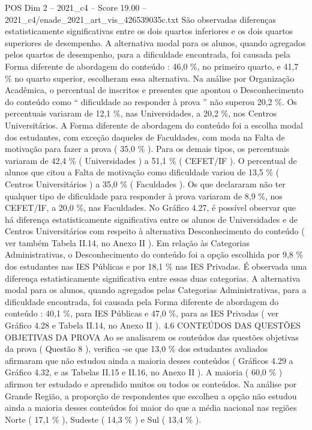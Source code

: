 \begin{textsample}{POS Dim 2 – 2021\_c4 – Score 19.00 – 2021\_c4/enade\_2021\_art\_vis\_426539035c.txt}
São observadas diferenças estatisticamente significativas entre os dois quartos inferiores e os dois quartos superiores de desempenho.
A alternativa modal para os alunos, quando agregados pelos quartos de desempenho, para a dificuldade encontrada, foi causada pela Forma diferente de abordagem do conteúdo : 46,0 \%, no primeiro quarto, e 41,7 \% no quarto superior, escolheram essa alternativa.
Na análise por Organização Acadêmica, o percentual de inscritos e presentes que apontou o Desconhecimento do conteúdo como “ dificuldade ao responder à prova ” não superou 20,2 \%.
Os percentuais variaram de 12,1 \%, nas Universidades, a 20,2 \%, nos Centros Universitários.
A Forma diferente de abordagem do conteúdo foi a escolha modal dos estudantes, com exceção daqueles de Faculdades, com moda na Falta de motivação para fazer a prova ( 35,0 \% ).
Para os demais tipos, os percentuais variaram de 42,4 \% ( Universidades ) a 51,1 \% ( CEFET/IF ).
O percentual de alunos que citou a Falta de motivação como dificuldade variou de 13,5 \% ( Centros Universitários ) a 35,0 \% ( Faculdades ).
Os que declararam não ter qualquer tipo de dificuldade para responder à prova variaram de 8,9 \%, nos CEFET/IF, a 20,0 \%, nas Faculdades.
No Gráfico 4.27, é possível observar que há diferença estatisticamente significativa entre os alunos de Universidades e de Centros Universitários com respeito à alternativa Desconhecimento do conteúdo ( ver também Tabela II.14, no Anexo II ).
Em relação às Categorias Administrativas, o Desconhecimento do conteúdo foi a opção escolhida por 9,8 \% dos estudantes nas IES Públicas e por 18,1 \% nas IES Privadas.
É observada uma diferença estatisticamente significativa entre essas duas categorias.
A alternativa modal para os alunos, quando agregados pelas Categorias Administrativas, para a dificuldade encontrada, foi causada pela Forma diferente de abordagem do conteúdo : 40,1 \%, para IES Públicas e 47,0 \%, para as IES Privadas ( ver Gráfico 4.28 e Tabela II.14, no Anexo II ). 4.6 CONTEÚDOS DAS QUESTÕES OBJETIVAS DA PROVA Ao se analisarem os conteúdos das questões objetivas da prova ( Questão 8 ), verifica -se que 13,0 \% dos estudantes avaliados afirmaram que não estudou ainda a maioria desses conteúdos ( Gráficos 4.29 a Gráfico 4.32, e as Tabelas II.15 e II.16, no Anexo II ).
A maioria ( 60,0 \% ) afirmou ter estudado e aprendido muitos ou todos os conteúdos.
Na análise por Grande Região, a proporção de respondentes que escolheu a opção não estudou ainda a maioria desses conteúdos foi maior do que a média nacional nas regiões Norte ( 17,1 \% ), Sudeste ( 14,3 \% ) e Sul ( 13,4 \% ).

\end{textsample}
